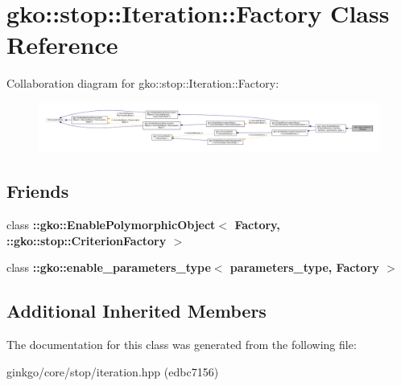 \hypertarget{classgko_1_1stop_1_1Iteration_1_1Factory}{}\section{gko\+:\+:stop\+:\+:Iteration\+:\+:Factory Class Reference}
\label{classgko_1_1stop_1_1Iteration_1_1Factory}


Collaboration diagram for gko\+:\+:stop\+:\+:Iteration\+:\+:Factory\+:
\nopagebreak
\begin{figure}[H]
\begin{center}
\leavevmode
\includegraphics[width=350pt]{classgko_1_1stop_1_1Iteration_1_1Factory__coll__graph}
\end{center}
\end{figure}
\subsection*{Friends}
\begin{DoxyCompactItemize}
\item 
\mbox{\label{classgko_1_1stop_1_1Iteration_1_1Factory_aaa5507cf00e5361a77971746fefa42e6}} 
class {\bfseries \+::gko\+::\+Enable\+Polymorphic\+Object$<$ Factory, \+::gko\+::stop\+::\+Criterion\+Factory $>$}
\item 
\mbox{\label{classgko_1_1stop_1_1Iteration_1_1Factory_a0d176cbd42d6214e11aee8c30ca256fc}} 
class {\bfseries \+::gko\+::enable\+\_\+parameters\+\_\+type$<$ parameters\+\_\+type, Factory $>$}
\end{DoxyCompactItemize}
\subsection*{Additional Inherited Members}


The documentation for this class was generated from the following file\+:\begin{DoxyCompactItemize}
\item 
ginkgo/core/stop/iteration.\+hpp (edbc7156)\end{DoxyCompactItemize}
